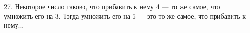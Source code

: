 27. Некоторое число таково, что прибавить к нему 4 --- то же самое, что умножить его на 3. Тогда умножить его на 6 --- это то же самое, что прибавить к нему...\\

